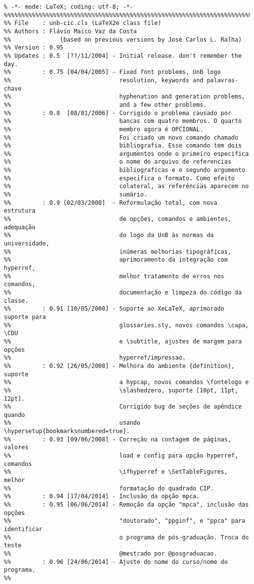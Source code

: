 \small\begin{verbatim}
% -*- mode: LaTeX; coding: utf-8; -*-
%%%%%%%%%%%%%%%%%%%%%%%%%%%%%%%%%%%%%%%%%%%%%%%%%%%%%%%%%%%%%%%%%%%%%%%%%%%%%%%
%% File    : unb-cic.cls (LaTeX2e class file)
%% Authors : Flávio Maico Vaz da Costa
%%              (based on previous versions by José Carlos L. Ralha)
%% Version : 0.95
%% Updates : 0.5  [??/11/2004] - Initial release. don't remember the day.
%%         : 0.75 [04/04/2005] - Fixed font problems, UnB logo
%%                               resolution, keywords and palavras-chave
%%                               hyphenation and generation problems,
%%                               and a few other problems.
%%         : 0.8  [08/01/2006] - Corrigido o problema causado por
%%                               bancas com quatro membros. O quarto
%%                               membro agora é OPCIONAL.
%%                               Foi criado um novo comando chamado
%%                               bibliografia. Esse comando tem dois
%%                               argumentos onde o primeiro especifica
%%                               o nome do arquivo de referencias
%%                               bibliograficas e o segundo argumento
%%                               especifica o formato. Como efeito
%%                               colateral, as referências aparecem no
%%                               sumário.
%%         : 0.9 [02/03/2008]  - Reformulação total, com nova estrutura
%%                               de opções, comandos e ambientes, adequação
%%                               do logo da UnB às normas da universidade,
%%                               inúmeras melhorias tipográficas,
%%                               aprimoramento da integração com hyperref,
%%                               melhor tratamento de erros nos comandos,
%%                               documentação e limpeza do código da classe.
%%         : 0.91 [10/05/2008] - Suporte ao XeLaTeX, aprimorado suporte para
%%                               glossaries.sty, novos comandos \capa, \CDU
%%                               e \subtitle, ajustes de margem para opções
%%                               hyperref/impressao.
%%         : 0.92 [26/05/2008] - Melhora do ambiente {definition}, suporte
%%                               a hypcap, novos comandos \fontelogo e
%%                               \slashedzero, suporte [10pt, 11pt, 12pt].
%%                               Corrigido bug de seções de apêndice quando
%%                               usando \hypersetup{bookmarksnumbered=true}.
%%         : 0.93 [09/06/2008] - Correção na contagem de páginas, valores
%%                               load e config para opção hyperref, comandos
%%                               \ifhyperref e \SetTableFigures, melhor
%%                               formatação do quadrado CIP. 
%%         : 0.94 [17/04/2014] - Inclusão da opção mpca. 
%%         : 0.95 [06/06/2014] - Remoção da opção "mpca", inclusão das opções
%%                               "doutorado", "ppginf", e "ppca" para identificar
%%                               o programa de pós-graduação. Troca do teste 
%%                               @mestrado por @posgraduacao.
%%         : 0.96 [24/06/2014] - Ajuste do nome do curso/nome do programa.
%%
\end{verbatim}